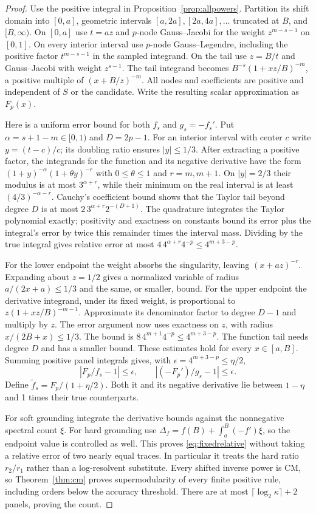 \begin{proof}
Use the positive integral in Proposition~\ref{prop:allpowers}.
Partition its shift domain into $[0,a]$, geometric intervals
$[a,2a],[2a,4a],\ldots$ truncated at $B$, and $[B,\infty)$.
On $[0,a]$ use $t=az$ and $p$-node Gauss--Jacobi for the weight
$z^{m-s-1}$ on $[0,1]$. On every interior interval use $p$-node
Gauss--Legendre, including the positive factor $t^{m-s-1}$ in
the sampled integrand. On the tail use $z=B/t$ and Gauss--Jacobi
with weight $z^{s-1}$. The tail integrand becomes
$B^{-s}(1+xz/B)^{-m}$, a positive multiple of
$(x+B/z)^{-m}$. All nodes and coefficients are positive and
independent of $S$ or the candidate. Write the resulting scalar
approximation as $F_p(x)$.

Here is a uniform error bound for both $f_s$ and $g_s=-f_s'$.
Put $\alpha=s+1-m\in[0,1)$ and $D=2p-1$.
For an interior interval with center $c$ write $y=(t-c)/c$;
its doubling ratio ensures $|y|\leq1/3$. After extracting a
positive factor, the integrands for the function and its negative
derivative have the form
$(1+y)^{-\alpha}(1+\theta y)^{-r}$ with $0\leq\theta\leq1$
and $r=m,m+1$. On $|y|=2/3$ their modulus is at most
$3^{\alpha+r}$, while their minimum on the real interval is at
least $(4/3)^{-\alpha-r}$.
Cauchy's coefficient bound shows that the Taylor tail beyond degree
$D$ is at most $2\,3^{\alpha+r}2^{-(D+1)}$.
The quadrature integrates the Taylor polynomial exactly; positivity
and exactness on constants bound its error plus the integral's error
by twice this remainder times the interval mass. Dividing by the
true integral gives relative error at most
$4\,4^{\alpha+r}4^{-p}\leq4^{m+3-p}$.

For the lower endpoint the weight absorbs the singularity, leaving
$(x+az)^{-r}$. Expanding about $z=1/2$ gives a normalized variable
of radius $a/(2x+a)\leq1/3$ and the same, or smaller, bound.
For the upper endpoint the derivative integrand, under its fixed
weight, is proportional to $z(1+xz/B)^{-m-1}$.
Approximate its denominator factor to degree $D-1$ and multiply
by $z$. The error argument now uses exactness on $z$, with radius
$x/(2B+x)\leq1/3$. The bound is
$8\,4^{m+1}4^{-p}\leq4^{m+3-p}$.
The function tail needs degree $D$ and has a smaller bound.
These estimates hold for every $x\in[a,B]$. Summing positive panel
integrals gives, with $\epsilon=4^{m+3-p}\leq\eta/2$,
\[
 |F_p/f_s-1|\leq\epsilon,\qquad
 |(-F_p')/g_s-1|\leq\epsilon.
\]
Define $\widetilde f_s=F_p/(1+\eta/2)$. Both it and its negative
derivative lie between $1-\eta$ and 1 times their true counterparts.

For soft grounding integrate the derivative bounds against the
nonnegative spectral count $\xi$. For hard grounding use
$\Delta_f=f(B)+\int_a^B(-f')\xi$, so the endpoint value is controlled
as well. This proves \eqref{eq:fixedrelative} without taking a
relative error of two nearly equal traces. In particular it treats
the hard ratio $r_2/r_1$ rather than a log-resolvent substitute.
Every shifted inverse power is CM, so Theorem~\ref{thm:cm} proves
supermodularity of every finite positive rule, including orders
below the accuracy threshold. There are at most
$\lceil\log_2\kappa\rceil+2$ panels, proving the count.
\end{proof}


